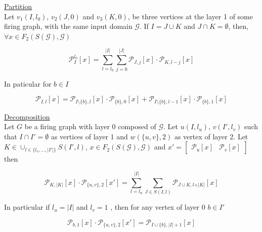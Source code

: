 \documentclass[a4paper, 11pt]{article}
\begin{document}
\underline{Partition}\\

Let $v_1(I, l_0)$, $v_2(J, 0)$ and $v_3(K, 0)$, be three vertices at the layer 1 of some firing graph, with the same input domain $\mathcal{G}$. If $I = J \cup K$ and $J \cap K = \emptyset$, then, $\forall x \in F_2(S(\mathcal{G}), \mathcal{G})$

\begin{equation}
\label{prop:partition-1}
\mathcal{P}_I^{l_0}\left[ x \right] = \sum_{l=l_0}^{\vert I \vert} \sum_{j=0}^{\vert J \vert} \mathcal{P}_{J, j}\left[ x \right]  \cdot \mathcal{P}_{K, l - j}\left[ x \right] 
\end{equation} 

In paticular for $b \in I$

\begin{equation}
\label{prop:partition-2}
\mathcal{P}_{I, l}\left[ x \right] = \mathcal{P}_{I\setminus \{ b\}, l}\left[ x \right] \cdot \mathcal{P}_{\{ b\}, 0}\left[ x \right] + \mathcal{P}_{I\setminus \{ b\}, l-1}\left[ x \right] \cdot \mathcal{P}_{\{ b\}, 1}\left[ x \right]
\end{equation} 

\underline{Decomposition}\\

Let $G$ be a firing graph with layer 0 composed of $\mathcal{G}$. Let $u(I, l_u)$, $v(I', l_v)$ such that $I \cap I' = \emptyset$ as vertices of layer 1 and $w(\{ u, v \}, 2)$ as vertex of layer 2. Let $K \in \cup_{l \in \{l_v, \ldots, \vert I' \vert \}} S(I', l)$, $x \in F_2(S(\mathcal{G}), \mathcal{G})$ and $x' = \begin{bmatrix} \mathcal{P}_{u}[x] &\mathcal{P}_{v}[x] \end{bmatrix}$ then 


\begin{equation}
\label{prop:2layer-1}
\mathcal{P}_{K, \vert K \vert}\left[ x \right] \cdot \mathcal{P}_{\{u, v\}, 2}\left[ x' \right] = \sum_{l=l_u}^{\vert I \vert}  \sum_{J \in S(I, l)} \mathcal{P}_{J \cup K, l + \vert K \vert }\left[ x \right]
\end{equation}

In particular if $l_u = \vert I \vert$ and $l_v = 1$ , then for any vertex of layer 0 $b \in I'$

\begin{equation}
\label{prop:2layer-2}
 \mathcal{P}_{b, 1}\left[ x \right] \cdot \mathcal{P}_{\{u, v\}, 2} \left[ x' \right]= \mathcal{P}_{I \cup \{b\}, \vert I \vert + 1}\left[ x \right]
\end{equation}
\end{document}
